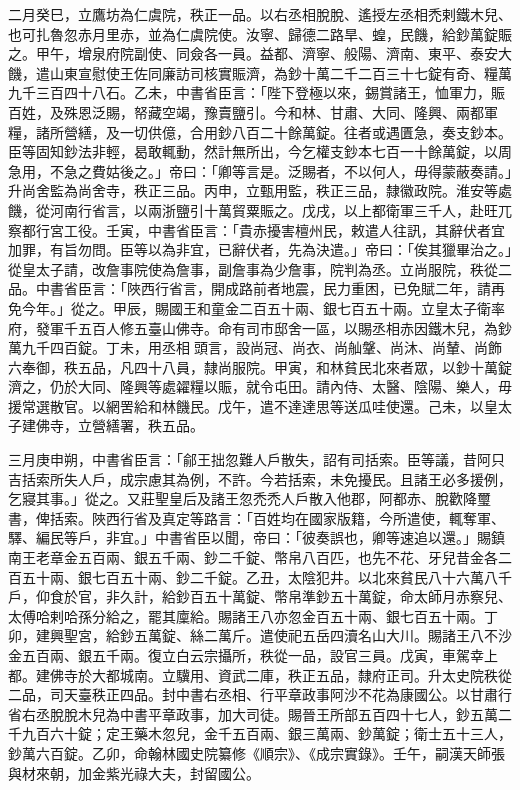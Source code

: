\begin{pinyinscope}
 二月癸巳，立鷹坊為仁虞院，秩正一品。以右丞相脫脫、遙授左丞相禿剌鐵木兒、也可扎魯忽赤月里赤，並為仁虞院使。汝寧、歸德二路旱、蝗，民饑，給鈔萬錠賑之。甲午，增泉府院副使、同僉各一員。益都、濟寧、般陽、濟南、東平、泰安大饑，遣山東宣慰使王佐同廉訪司核實賑濟，為鈔十萬二千二百三十七錠有奇、糧萬九千三百四十八石。乙未，中書省臣言：「陛下登極以來，錫賞諸王，恤軍力，賑百姓，及殊恩泛賜，帑藏空竭，豫賣鹽引。今和林、甘肅、大同、隆興、兩都軍糧，諸所營繕，及一切供億，合用鈔八百二十餘萬錠。往者或遇匱急，奏支鈔本。臣等固知鈔法非輕，曷敢輒動，然計無所出，今乞權支鈔本七百一十餘萬錠，以周急用，不急之費姑後之。」帝曰：「卿等言是。泛賜者，不以何人，毋得蒙蔽奏請。」升尚舍監為尚舍寺，秩正三品。丙申，立甄用監，秩正三品，隸徽政院。淮安等處饑，從河南行省言，以兩浙鹽引十萬貿粟賑之。戊戌，以上都衛軍三千人，赴旺兀察都行宮工役。壬寅，中書省臣言：「貴赤擾害檀州民，敕遣人往訊，其辭伏者宜加罪，有旨勿問。臣等以為非宜，已辭伏者，先為決遣。」帝曰：「俟其獵畢治之。」從皇太子請，改詹事院使為詹事，副詹事為少詹事，院判為丞。立尚服院，秩從二品。中書省臣言：「陜西行省言，開成路前者地震，民力重困，已免賦二年，請再免今年。」從之。甲辰，賜國王和童金二百五十兩、銀七百五十兩。立皇太子衛率府，發軍千五百人修五臺山佛寺。命有司市邸舍一區，以賜丞相赤因鐵木兒，為鈔萬九千四百錠。丁未，用丞相頭言，設尚冠、尚衣、尚舢鞶、尚沐、尚輦、尚飾六奉御，秩五品，凡四十八員，隸尚服院。甲寅，和林貧民北來者眾，以鈔十萬錠濟之，仍於大同、隆興等處糴糧以賑，就令屯田。請內侍、太醫、陰陽、樂人，毋援常選散官。以網罟給和林饑民。戊午，遣不達達思等送瓜哇使還。己未，以皇太子建佛寺，立營繕署，秩五品。



 三月庚申朔，中書省臣言：「鄃王拙忽難人戶散失，詔有司括索。臣等議，昔阿只吉括索所失人戶，成宗慮其為例，不許。今若括索，未免擾民。且諸王必多援例，乞寢其事。」從之。又莊聖皇后及諸王忽禿禿人戶散入他郡，阿都赤、脫歡降璽書，俾括索。陜西行省及真定等路言：「百姓均在國家版籍，今所遣使，輒奪軍、驛、編民等戶，非宜。」中書省臣以聞，帝曰：「彼奏誤也，卿等速追以還。」賜鎮南王老章金五百兩、銀五千兩、鈔二千錠、幣帛八百匹，也先不花、牙兒昔金各二百五十兩、銀七百五十兩、鈔二千錠。乙丑，太陰犯井。以北來貧民八十六萬八千戶，仰食於官，非久計，給鈔百五十萬錠、幣帛準鈔五十萬錠，命太師月赤察兒、太傅哈剌哈孫分給之，罷其廩給。賜諸王八亦忽金百五十兩、銀七百五十兩。丁卯，建興聖宮，給鈔五萬錠、絲二萬斤。遣使祀五岳四瀆名山大川。賜諸王八不沙金五百兩、銀五千兩。復立白云宗攝所，秩從一品，設官三員。戊寅，車駕幸上都。建佛寺於大都城南。立驥用、資武二庫，秩正五品，隸府正司。升太史院秩從二品，司天臺秩正四品。封中書右丞相、行平章政事阿沙不花為康國公。以甘肅行省右丞脫脫木兒為中書平章政事，加大司徒。賜晉王所部五百四十七人，鈔五萬二千九百六十錠；定王藥木忽兒，金千五百兩、銀三萬兩、鈔萬錠；衛士五十三人，鈔萬六百錠。乙卯，命翰林國史院纂修《順宗》、《成宗實錄》。壬午，嗣漢天師張與材來朝，加金紫光祿大夫，封留國公。




\end{pinyinscope}
